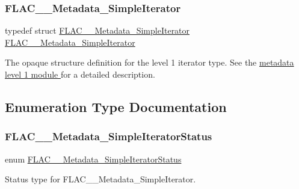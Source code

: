 \subsubsection{\texorpdfstring{F\+L\+A\+C\+\_\+\+\_\+\+Metadata\+\_\+\+Simple\+Iterator}{FLAC\_\_Metadata\_SimpleIterator}}
{\footnotesize\ttfamily typedef struct \hyperlink{group__flac__metadata__level1_ga6accccddbb867dfc2eece9ee3ffecb3a}{F\+L\+A\+C\+\_\+\+\_\+\+Metadata\+\_\+\+Simple\+Iterator} \hyperlink{group__flac__metadata__level1_ga6accccddbb867dfc2eece9ee3ffecb3a}{F\+L\+A\+C\+\_\+\+\_\+\+Metadata\+\_\+\+Simple\+Iterator}}

The opaque structure definition for the level 1 iterator type. See the \hyperlink{group__flac__metadata__level1}{metadata level 1 module } for a detailed description. 

\subsection{Enumeration Type Documentation}
\mbox{\label{group__flac__metadata__level1_gac926e7d2773a05066115cac9048bbec9}} 
\subsubsection{\texorpdfstring{F\+L\+A\+C\+\_\+\+\_\+\+Metadata\+\_\+\+Simple\+Iterator\+Status}{FLAC\_\_Metadata\_SimpleIteratorStatus}}
{\footnotesize\ttfamily enum \hyperlink{group__flac__metadata__level1_gac926e7d2773a05066115cac9048bbec9}{F\+L\+A\+C\+\_\+\+\_\+\+Metadata\+\_\+\+Simple\+Iterator\+Status}}

Status type for F\+L\+A\+C\+\_\+\+\_\+\+Metadata\+\_\+\+Simple\+Iterator.

